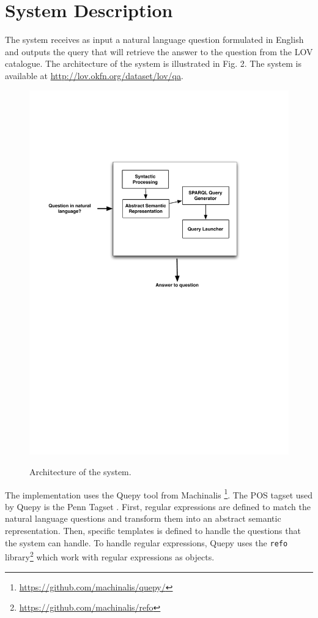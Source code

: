 \documentclass[runningheads,a4paper]{llncs}
\begin{document}
\section{System Description}
\label{sec:system}

The system receives as input a natural language question formulated in English and outputs the query that will retrieve the answer to the question from the LOV catalogue. The architecture of the system is illustrated in Fig. 2. The system is available at \url{http://lov.okfn.org/dataset/lov/qa}.

\begin{figure}[ht!b]
\centering
\caption{Architecture of the system.}
\includegraphics[scale=.6]{qa4lov-archi.pdf}
\label{fig:q4lovarchi}
\end{figure}

The implementation uses the Quepy tool from Machinalis \footnote{\url{https://github.com/machinalis/quepy/}}. The POS tagset used by Quepy is the Penn Tagset \cite{marcus1993building}. First, regular expressions are defined to match the natural language questions and transform them into an abstract semantic representation. Then, specific templates is defined to handle the questions that the system can handle. To handle regular expressions, Quepy uses the \texttt{refo} library\footnote{\url{https://github.com/machinalis/refo}} which work with regular expressions as objects. 
\end{document}
